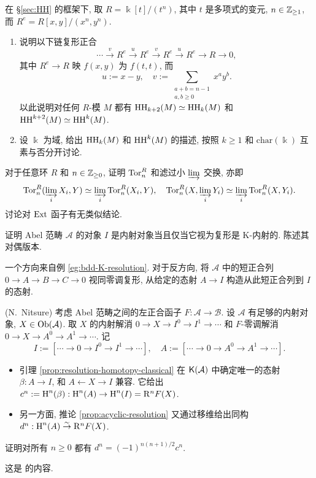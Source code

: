 \begin{Exercises}
	\item 在 \S\ref{sec:HH} 的框架下, 取 $R = \Bbbk[t]/(t^n)$, 其中 $t$ 是多项式的变元, $n \in \mathbb{Z}_{\geq 1}$, 而 $R^e = R[x,y]/(x^n, y^n)$.
	\begin{enumerate}
		\item 说明以下链复形正合
		\[ \cdots \xrightarrow{v} R^e \xrightarrow{u} R^e \xrightarrow{v} R^e \xrightarrow{u} R^e \to R \to 0 , \]
		其中 $R^e \to R$ 映 $f(x,y)$ 为 $f(t,t)$, 而
		\[ u := x-y, \quad v := \sum_{\substack{a+b=n-1 \\ a, b \geq 0}} x^a y^b . \]
		以此说明对任何 $R$-模 $M$ 都有 $\operatorname{HH}_{k+2}(M) \simeq \operatorname{HH}_k(M)$ 和 $\operatorname{HH}^{k+2}(M) \simeq \operatorname{HH}^k(M)$.

		\item 设 $\Bbbk$ 为域, 给出 $\operatorname{HH}_k(M)$ 和 $\operatorname{HH}^k(M)$ 的描述, 按照 $k \geq 1$ 和 $\mathrm{char}(\Bbbk)$ 互素与否分开讨论.
	\end{enumerate}

	\item 对于任意环 $R$ 和 $n \in \mathbb{Z}_{\geq 0}$, 证明 $\operatorname{Tor}^R_n$ 和滤过小 $\varinjlim$ 交换, 亦即
	\[ \operatorname{Tor}^R_n(\varinjlim_i X_i, Y) \simeq \varinjlim_i \operatorname{Tor}^R_n(X_i, Y), \quad \operatorname{Tor}^R_n(X, \varinjlim_i Y_i) \simeq \varinjlim_i \operatorname{Tor}^R_n(X, Y_i). \]
	讨论对 $\operatorname{Ext}$ 函子有无类似结论.

	\item 证明 Abel 范畴 $\mathcal{A}$ 的对象 $I$ 是内射对象当且仅当它视为复形是 K-内射的. 陈述其对偶版本.
	\begin{hint}
		一个方向来自例 \ref{eg:bdd-K-resolution}. 对于反方向, 将 $\mathcal{A}$ 中的短正合列 $0 \to A \to B \to C \to 0$ 视同零调复形, 从给定的态射 $A \to I$ 构造从此短正合列到 $I$ 的态射.
	\end{hint}

	\item (N.\ Nitsure) 考虑 Abel 范畴之间的左正合函子 $F: \mathcal{A} \to \mathcal{B}$. 设 $\mathcal{A}$ 有足够的内射对象, $X \in \operatorname{Ob}(\mathcal{A})$. 取 $X$ 的内射解消 $0 \to X \to I^0 \to I^1 \to \cdots$ 和 $F$-零调解消 $0 \to X \to A^0 \to A^1 \to \cdots$. 记
	\[ I := [\cdots \to 0 \to I^0 \to I^1 \to \cdots], \quad A := [\cdots \to 0 \to A^0 \to A^1 \to \cdots ]. \]
	\begin{itemize}
		\item 引理 \ref{prop:resolution-homotopy-classical} 在 $\mathsf{K}(\mathcal{A})$ 中确定唯一的态射 $\beta: A \to I$, 和 $A \leftarrow X \rightarrow I$ 兼容. 它给出 $c^n := \operatorname{H}^n(\beta): \operatorname{H}^n(A) \to \operatorname{H}^n(I) = \mathrm{R}^n F(X)$.
		\item 另一方面, 推论 \ref{prop:acyclic-resolution} 又通过移维给出同构 $d^n: \operatorname{H}^n(A) \stackrel{\sim}{\rightarrow} \mathrm{R}^n F(X)$.
	\end{itemize}
	证明对所有 $n \geq 0$ 都有 $d^n = (-1)^{n(n+1)/2} c^n$.
	\begin{hint}
		这是 \cite{Ni09} 的内容.
	\end{hint}
\end{Exercises}
